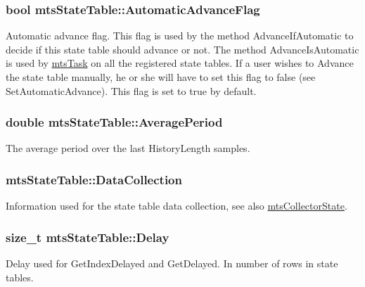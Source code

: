 \subsubsection[{Automatic\+Advance\+Flag}]{\setlength{\rightskip}{0pt plus 5cm}bool mts\+State\+Table\+::\+Automatic\+Advance\+Flag\hspace{0.3cm}{\ttfamily [protected]}}\label{classmts_state_table_acbe22d62ae7c8190c92059bc50da941d}
Automatic advance flag. This flag is used by the method Advance\+If\+Automatic to decide if this state table should advance or not. The method Advance\+Is\+Automatic is used by \hyperlink{classmts_task}{mts\+Task} on all the registered state tables. If a user wishes to Advance the state table manually, he or she will have to set this flag to false (see Set\+Automatic\+Advance). This flag is set to true by default. \hypertarget{classmts_state_table_a5005978e1547af1b2b864fa366585468}{}
\subsubsection[{Average\+Period}]{\setlength{\rightskip}{0pt plus 5cm}double mts\+State\+Table\+::\+Average\+Period\hspace{0.3cm}{\ttfamily [protected]}}\label{classmts_state_table_a5005978e1547af1b2b864fa366585468}
The average period over the last History\+Length samples. \hypertarget{classmts_state_table_ae1da5c16bcb4faa19c35c2cfb1dee023}{}
\subsubsection[{Data\+Collection}]{ mts\+State\+Table\+::\+Data\+Collection\hspace{0.3cm}{\ttfamily [protected]}}\label{classmts_state_table_ae1da5c16bcb4faa19c35c2cfb1dee023}
Information used for the state table data collection, see also \hyperlink{classmts_collector_state}{mts\+Collector\+State}. \hypertarget{classmts_state_table_af676579bdc8d7e1a8616708a612dbed1}{}
\subsubsection[{Delay}]{\setlength{\rightskip}{0pt plus 5cm}size\+\_\+t mts\+State\+Table\+::\+Delay\hspace{0.3cm}{\ttfamily [protected]}}\label{classmts_state_table_af676579bdc8d7e1a8616708a612dbed1}
Delay used for Get\+Index\+Delayed and Get\+Delayed. In number of rows in state tables. \hypertarget{classmts_state_table_a922d394133217df6961407a890d21913}{}
